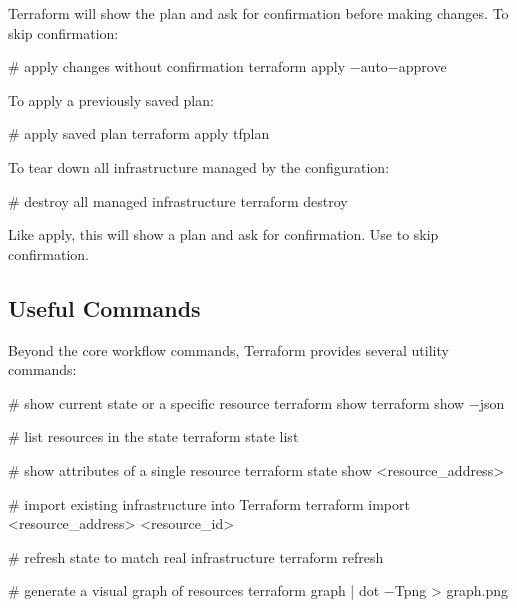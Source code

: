Terraform will show the plan and ask for confirmation before making changes. To skip confirmation:

\begin{bash}
# apply changes without confirmation
terraform apply $-$auto$-$approve
\end{bash}

To apply a previously saved plan:

\begin{bash}
# apply saved plan
terraform apply tfplan
\end{bash}

To tear down all infrastructure managed by the configuration:

\begin{bash}
# destroy all managed infrastructure
terraform destroy
\end{bash}

Like apply, this will show a plan and ask for confirmation. Use  to skip confirmation.

\subsection{Useful Commands}

Beyond the core workflow commands, Terraform provides several utility commands:

\begin{bash}
# show current state or a specific resource
terraform show
terraform show $-$json
\end{bash}

\begin{bash}
# list resources in the state
terraform state list
\end{bash}

\begin{bash}
# show attributes of a single resource
terraform state show <resource_address>
\end{bash}

\begin{bash}
# import existing infrastructure into Terraform
terraform import <resource_address> <resource_id>
\end{bash}

\begin{bash}
# refresh state to match real infrastructure
terraform refresh
\end{bash}

\begin{bash}
# generate a visual graph of resources
terraform graph | dot $-$Tpng > graph.png
\end{bash}

